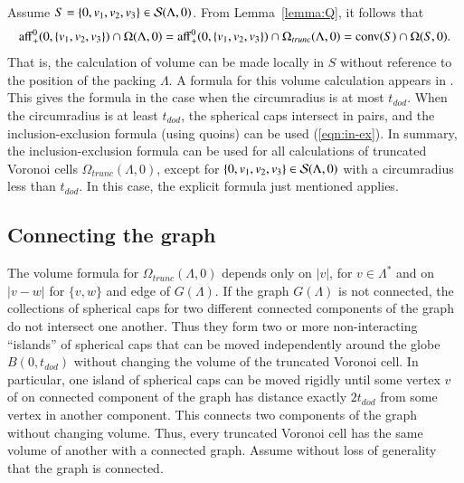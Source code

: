 \documentclass{article} %
\begin{document}
Assume $S=\{0,v_1,v_2,v_3\}\in {\mathcal S}(\Lambda,0)$.
From Lemma~\ref{lemma:Q}, it follows that
\begin{equation}\label{eqn:omega-3}
{\operatorname{aff}}^0_+(0,\{v_1,v_2,v_3\}) \cap \Omega(\Lambda,0) = 
{\operatorname{aff}}^0_+(0,\{v_1,v_2,v_3\}) \cap \Omega_{trunc}(\Lambda,0) = 
{\operatorname{conv}}(S)\cap\Omega(S,0).
\end{equation}
That is, the calculation of volume can be made locally in $S$ without
reference to the position of the packing $\Lambda$.
A formula for this volume calculation appears in 
\cite[\S8.6.3]{Hales:1997:DCG}.  This gives the formula in the case
when the circumradius is at most $t_{dod}$.  When the circumradius
is at least $t_{dod}$, the spherical caps intersect in pairs,
and the inclusion-exclusion formula (using quoins)
can be used (\ref{eqn:in-ex}).
In summary, the inclusion-exclusion formula can be used for all
calculations of truncated Voronoi cells $\Omega_{trunc}(\Lambda,0)$,
except for $\{0,v_1,v_2,v_3\}\in {\mathcal S}(\Lambda,0)$ with
a circumradius less than $t_{dod}$.  In this case, 
the explicit formula just mentioned applies.

\subsection{Connecting the graph}

The volume formula for $\Omega_{trunc}(\Lambda,0)$ depends only on
$|v|$, for $v\in\Lambda^*$ and on $|v-w|$ for $\{v,w\}$ and edge of
$G(\Lambda)$. If the graph $G(\Lambda)$ is not connected, the
collections of spherical caps for two different connected components of
the graph do not intersect one another. Thus they form two or more
non-interacting ``islands'' of spherical caps that can be moved
independently around the globe $B(0,t_{dod})$ without changing the
volume of the truncated Voronoi cell. In particular, one island of
spherical caps can be moved rigidly until some vertex $v$ of on
connected component of the graph has distance exactly $2t_{dod}$ from
some vertex in another component. This connects two components of the
graph without changing volume. Thus, every truncated Voronoi cell has
the same volume of another with a connected graph. Assume without loss
of generality that the graph is connected.
\end{document}
